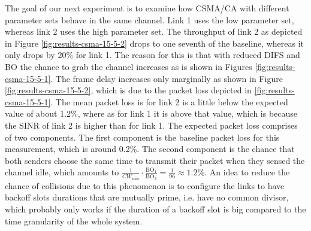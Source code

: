 The goal of our next experiment is to examine how CSMA/CA with different parameter sets behave in the same channel. Link 1 uses the low parameter set, whereas link 2 uses the high parameter set. The throughput of link 2 as depicted in Figure \ref{fig:results-csma-15-5-2} drops to one seventh of the baseline, whereas it only drops by 20\% for link 1. The reason for this is that with reduced DIFS and BO the chance to grab the channel increases as is shown in Figures \ref{fig:results-csma-15-5-1}. The frame delay increases only marginally as shown in Figure \ref{fig:results-csma-15-5-2}, which is due to the packet loss depicted in \ref{fig:results-csma-15-5-1}. The mean packet loss is for link 2 is a little below the expected value of about 1.2\%, where as for link 1 it is above that value, which is because the SINR of link 2 is higher than for link 1. The expected packet loss comprises of two components. The first component is the baseline packet loss for this measurement, which is around 0.2\%. The second component is the chance that both senders choose the same time to transmit their packet when they sensed the channel idle, which amounts to $ \frac{1}{CW_\text{min}} \cdot \frac{\text{BO}_1}{\text{BO}_2} = \frac{1}{96} \approx 1.2\% $. An idea to reduce the chance of collisions due to this phenomenon is to configure the links to have backoff slots durations that are mutually prime, i.e. have no common divisor, which probably only works if the duration of a backoff slot is big compared to the time granularity of the whole system. 


